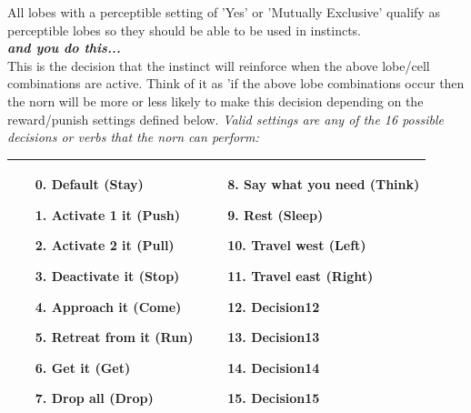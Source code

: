 \documentclass[11pt,twoside,a4paper]{article}
\begin{document}
All lobes with a perceptible setting of 'Yes' or 'Mutually Exclusive' qualify as perceptible lobes so they should be able to be used in instincts.~\\

\textbf{\textit{and you do this...}}~\\
This is the decision that the instinct will reinforce when the above lobe/cell combinations are active. Think of it as 'if the above lobe combinations occur then the norn will be more or less likely to make this decision depending on the reward/punish settings defined below. \emph{Valid settings are any of the 16 possible decisions or verbs that the norn can perform: }
	\begin{center} \begin{scriptsize}
		\begin{tabular}{|p{}|p{}|}
			\hline
			\begin{enumerate}
				\item[0.] Default (\textbf{Stay})
				\item[1.] Activate 1 it (\textbf{Push})
				\item[2.] Activate 2 it (\textbf{Pull})
				\item[3.] Deactivate it (\textbf{Stop})
				\item[4.] Approach it (\textbf{Come})
				\item[5.] Retreat from it (\textbf{Run})
				\item[6.] Get it (\textbf{Get})
				\item[7.] Drop all (\textbf{Drop})
			\end{enumerate}
			&
			\begin{enumerate}
				\item[8.] Say what you need (\textbf{Think})
				\item[9.] Rest (\textbf{Sleep})
				\item[10.] Travel west (\textbf{Left})
				\item[11.] Travel east (\textbf{Right})
				\item[12.] Decision12
				\item[13.] Decision13
				\item[14.] Decision14
				\item[15.] Decision15
			\end{enumerate} \\ \hline
		\end{tabular}
	\end{scriptsize} \end{center}~\\
\end{document}
